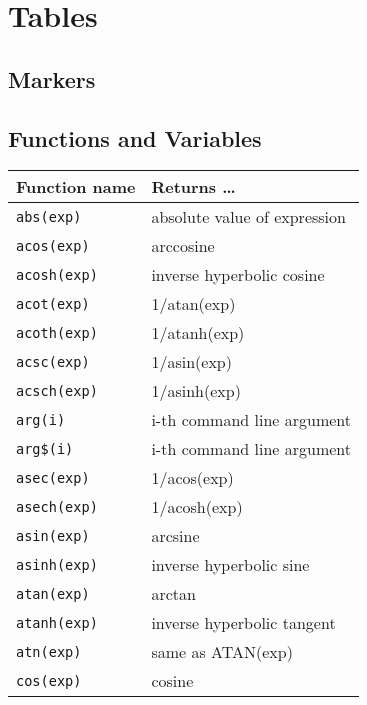\appendix                                                        
\chapter{Tables}
\section{Markers}
\mbox{}

\section{Functions and Variables}
\label{fct:sec}

\begin{supertabular}{ll} \hline
Function name     & Returns \ldots \\ \hline
{\tt abs(exp)}          	& absolute value of  expression \\
{\tt acos(exp)}        	& arccosine \\
{\tt acosh(exp)}      	& inverse hyperbolic cosine \\
{\tt acot(exp)}        	& 1/atan(exp) \\
{\tt acoth(exp)}      	& 1/atanh(exp) \\
{\tt acsc(exp)} 	     	& 1/asin(exp) \\
{\tt acsch(exp)}      	& 1/asinh(exp) \\
{\tt arg(i)}        	& i-th command line argument \\
{\tt arg\$(i)}        	& i-th command line argument \\
{\tt asec(exp)}        	& 1/acos(exp) \\
{\tt asech(exp)}      	& 1/acosh(exp) \\
{\tt asin(exp)}        	& arcsine \\
{\tt asinh(exp)}      	& inverse hyperbolic sine \\
{\tt atan(exp)}        	& arctan \\
{\tt atanh(exp)}      	& inverse hyperbolic tangent \\
{\tt atn(exp)}          	& same as ATAN(exp) \\
{\tt cos(exp)}          	& cosine \\

\end{supertabular}
